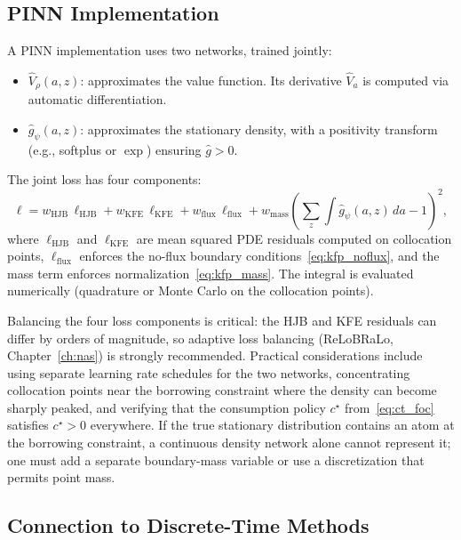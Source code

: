 \documentclass[11pt,a4paper]{report}
\begin{document}
\subsection{PINN Implementation}
\label{sec:ct_pinn}

A PINN implementation uses two networks, trained jointly:
\begin{itemize}[itemsep=2pt]
\item $\hat{V}_\rho(a,z)$: approximates the value function.  Its derivative $\hat{V}_a$ is computed via automatic differentiation.
\item $\hat{g}_\psi(a,z)$: approximates the stationary density, with a positivity transform (e.g., softplus or $\exp$) ensuring $\hat{g} > 0$.
\end{itemize}

The joint loss has four components:
\begin{equation}
\ell = w_{\mathrm{HJB}}\,\ell_{\mathrm{HJB}} + w_{\mathrm{KFE}}\,\ell_{\mathrm{KFE}} + w_{\mathrm{flux}}\,\ell_{\mathrm{flux}} + w_{\mathrm{mass}}\left(\sum_z\int \hat{g}_\psi(a,z)\,da - 1\right)^{\!2},
\label{eq:ct_loss}
\end{equation}
where $\ell_{\mathrm{HJB}}$ and $\ell_{\mathrm{KFE}}$ are mean squared PDE residuals computed on collocation points, $\ell_{\mathrm{flux}}$ enforces the no-flux boundary conditions~\eqref{eq:kfp_noflux}, and the mass term enforces normalization~\eqref{eq:kfp_mass}.  The integral is evaluated numerically (quadrature or Monte Carlo on the collocation points).

Balancing the four loss components is critical: the HJB and KFE residuals can differ by orders of magnitude, so adaptive loss balancing (ReLoBRaLo, Chapter~\ref{ch:nas}) is strongly recommended.  Practical considerations include using separate learning rate schedules for the two networks, concentrating collocation points near the borrowing constraint where the density can become sharply peaked, and verifying that the consumption policy $c^\star$ from~\eqref{eq:ct_foc} satisfies $c^\star > 0$ everywhere.  If the true stationary distribution contains an atom at the borrowing constraint, a continuous density network alone cannot represent it; one must add a separate boundary-mass variable or use a discretization that permits point mass.

\subsection{Connection to Discrete-Time Methods}
\label{sec:ct_comparison}
\end{document}
